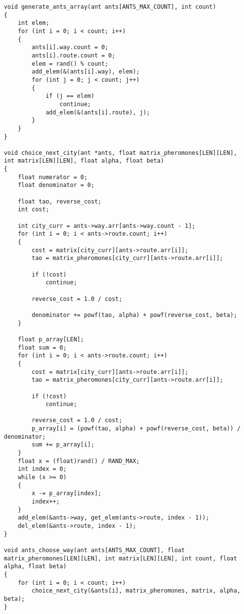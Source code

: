 \begin{lstlisting}[label=some-code,caption=Функции для работы с муравьями]
void generate_ants_array(ant ants[ANTS_MAX_COUNT], int count)
{
	int elem;
	for (int i = 0; i < count; i++)
	{
		ants[i].way.count = 0;
		ants[i].route.count = 0;
		elem = rand() % count;
		add_elem(&(ants[i].way), elem);
		for (int j = 0; j < count; j++)
		{
			if (j == elem)
				continue;
			add_elem(&(ants[i].route), j);
		}
	}
}

void choice_next_city(ant *ants, float matrix_pheromones[LEN][LEN], int matrix[LEN][LEN], float alpha, float beta)
{
	float numerator = 0;
	float denominator = 0;

	float tao, reverse_cost;
	int cost;

	int city_curr = ants->way.arr[ants->way.count - 1];
	for (int i = 0; i < ants->route.count; i++)
	{
		cost = matrix[city_curr][ants->route.arr[i]];
		tao = matrix_pheromones[city_curr][ants->route.arr[i]];

		if (!cost)
			continue;

		reverse_cost = 1.0 / cost;

		denominator += powf(tao, alpha) + powf(reverse_cost, beta);
	}

	float p_array[LEN];
	float sum = 0;
	for (int i = 0; i < ants->route.count; i++)
	{
		cost = matrix[city_curr][ants->route.arr[i]];
		tao = matrix_pheromones[city_curr][ants->route.arr[i]];

		if (!cost)
			continue;

		reverse_cost = 1.0 / cost;
		p_array[i] = (powf(tao, alpha) + powf(reverse_cost, beta)) / denominator;
		sum += p_array[i];
	}
	float x = (float)rand() / RAND_MAX;
	int index = 0;
	while (x >= 0)
	{
		x -= p_array[index];
		index++;
	}
	add_elem(&ants->way, get_elem(ants->route, index - 1));
	del_elem(&ants->route, index - 1);
}

void ants_choose_way(ant ants[ANTS_MAX_COUNT], float matrix_pheromones[LEN][LEN], int matrix[LEN][LEN], int count, float alpha, float beta)
{
	for (int i = 0; i < count; i++)
		choice_next_city(&ants[i], matrix_pheromones, matrix, alpha, beta);
}
\end{lstlisting}

